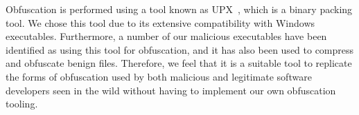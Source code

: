 \documentclass[main.tex]{subfiles}
\begin{document}
Obfuscation is performed using a tool known as UPX~\citep{markusf.x.j.oberhumerUPX2025}, which is a binary packing tool. We chose this tool due to its extensive compatibility with Windows executables. Furthermore, a number of our malicious executables have been identified as using this tool for obfuscation, and it has also been used to compress and obfuscate benign files. Therefore, we feel that it is a suitable tool to replicate the forms of obfuscation used by both malicious and legitimate software developers seen in the wild without having to implement our own obfuscation tooling.
\end{document}
